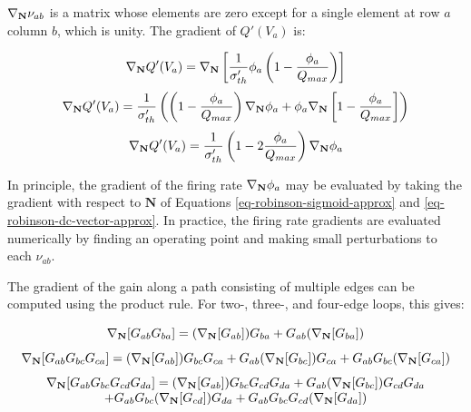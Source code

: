 $\nabla_{\mathbf{N}} \nu_{ab}$ is a matrix whose elements are zero except for a single
element at row $a$ column $b$, which is unity. The gradient of $Q'(V_a)$ is:

\begin{equation}
\nabla_{\mathbf{N}} Q'(V_a) = \nabla_{\mathbf{N}} \left [
\frac{1}{\sigma'_{th}} \phi_a \left ( 1 - \frac{\phi_a}{Q_{max}} \right )
\right ]
\end{equation}
%
\begin{equation}
\nabla_{\mathbf{N}} Q'(V_a) =
\frac{1}{\sigma'_{th}} \left (
\left ( 1 - \frac{\phi_a}{Q_{max}} \right ) \nabla_{\mathbf{N}} \phi_a
+ \phi_a \nabla_{\mathbf{N}} \left [ 1 - \frac{\phi_a}{Q_{max}} \right ]
\right )
\end{equation}
%
\begin{equation}
\nabla_{\mathbf{N}} Q'(V_a) = \frac{1}{\sigma'_{th}}
\left ( 1 - 2 \frac{\phi_a}{Q_{max}} \right ) \nabla_{\mathbf{N}} \phi_a
\label{eq-robinson-qprime-gradient}
\end{equation}

In principle, the gradient of the firing rate $\nabla_{\mathbf{N}} \phi_a$ may be
evaluated by taking the gradient with respect to $\mathbf{N}$ of Equations
\ref{eq-robinson-sigmoid-approx} and \ref{eq-robinson-dc-vector-approx}. In
practice, the firing rate gradients are evaluated numerically by finding an
operating point and making small perturbations to each $\nu_{ab}$.

The gradient of the gain along a path consisting of multiple edges can be
computed using the product rule. For two-, three-, and four-edge loops,
this gives:

\begin{equation}
\nabla_{\mathbf{N}} [ G_{ab} G_{ba} ] =
( \nabla_{\mathbf{N}} [ G_{ab} ] ) G_{ba} + G_{ab} ( \nabla_{\mathbf{N}} [ G_{ba} ] )
\label{eq-robinson-loop2-gain-gradient}
\end{equation}
%
\begin{equation}
\nabla_{\mathbf{N}} [ G_{ab} G_{bc} G_{ca} ] =
( \nabla_{\mathbf{N}} [ G_{ab} ] ) G_{bc} G_{ca} + G_{ab} ( \nabla_{\mathbf{N}} [ G_{bc} ] ) G_{ca}
+ G_{ab} G_{bc} ( \nabla_{\mathbf{N}} [ G_{ca} ] )
\label{eq-robinson-loop3-gain-gradient}
\end{equation}
%
\begin{equation}
\begin{array}{c}
\nabla_{\mathbf{N}} [ G_{ab} G_{bc} G_{cd} G_{da} ] =
( \nabla_{\mathbf{N}} [ G_{ab} ] ) G_{bc} G_{cd} G_{da}
+ G_{ab} ( \nabla_{\mathbf{N}} [ G_{bc} ] ) G_{cd} G_{da}
\\
+ G_{ab} G_{bc} ( \nabla_{\mathbf{N}} [ G_{cd} ] ) G_{da}
+ G_{ab} G_{bc} G_{cd} ( \nabla_{\mathbf{N}} [ G_{da} ] )
\end{array}
\label{eq-robinson-loop4-gain-gradient}
\end{equation}

